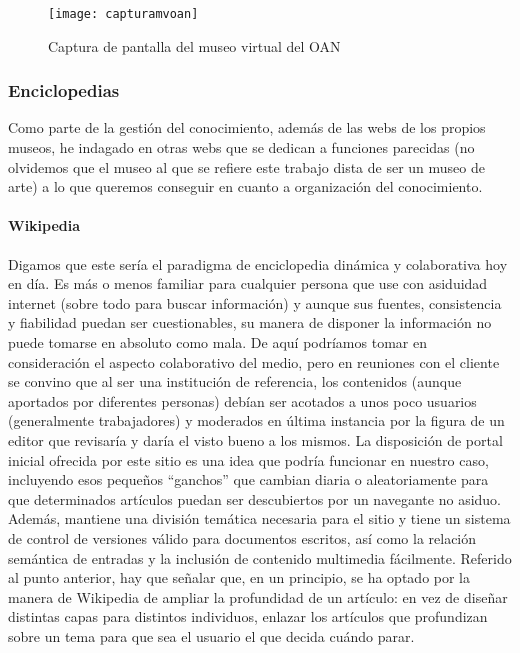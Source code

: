 \begin{figure}
\begin{narrow}{-0.1\linewidth}{-0.1\linewidth}
\centering
\texttt{[image: capturamvoan]}
\caption{Captura de pantalla del museo virtual del OAN}
\label{fig:oan}
\end{narrow}
\end{figure}

\subsubsection{Enciclopedias}

\par Como parte de la gestión del conocimiento, además de las webs de los propios museos, he indagado en otras webs que se dedican a funciones parecidas (no olvidemos que el museo al que se refiere este trabajo dista de ser un museo de arte) a lo que queremos conseguir en cuanto a organización del conocimiento.

\paragraph{Wikipedia}
\par Digamos que este sería el paradigma de enciclopedia dinámica y colaborativa hoy en día. Es más o menos familiar para cualquier persona que use con asiduidad internet (sobre todo para buscar información) y aunque sus fuentes, consistencia y fiabilidad puedan ser cuestionables, su manera de disponer la información no puede tomarse en absoluto como mala. De aquí podríamos tomar en consideración el aspecto colaborativo del medio, pero en reuniones con el cliente se convino que al ser una institución de referencia, los contenidos (aunque aportados por diferentes personas) debían ser acotados a unos poco usuarios (generalmente trabajadores) y moderados en última instancia por la figura de un editor que revisaría y daría el visto bueno a los mismos.
La disposición de portal inicial ofrecida por este sitio es una idea que podría funcionar en nuestro caso, incluyendo esos pequeños ``ganchos'' que cambian diaria o aleatoriamente para que determinados artículos puedan ser descubiertos por un navegante no asiduo. Además, mantiene una división temática necesaria para el sitio y tiene un sistema de control de versiones válido para documentos escritos, así como la relación semántica de entradas y la inclusión de contenido multimedia fácilmente.
Referido al punto anterior, hay que señalar que, en un principio, se ha optado por la manera de Wikipedia de ampliar la profundidad de un artículo: en vez de diseñar distintas capas para distintos individuos, enlazar los artículos que profundizan sobre un tema para que sea el usuario el que decida cuándo parar.


